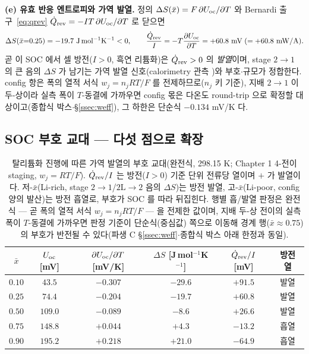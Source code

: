 \textbf{(e) 유효 반응 엔트로피와 가역 발열.} 정의 $\Delta S(\bar x)=F\,\partial U_{\mathrm{oc}}/\partial T$ 와 Bernardi
출구~\eqref{eq:qrev} $\dot Q_{\mathrm{rev}}=-IT\,\partial U_{\mathrm{oc}}/\partial T$ 로 닫으면
\begin{equation*}
\Delta S(\bar x{=}0.25)=-19.7\ \mathrm{J\,mol^{-1}K^{-1}}<0,
\qquad
\frac{\dot Q_\rev}{I}=-T\frac{\partial U_\oc}{\partial T}=+60.8\ \mathrm{mV}\;(=+60.8\ \mathrm{mW/A}).
\end{equation*}
곧 이 SOC 에서 셀 방전($I>0$, 흑연 리튬화)은 $\dot Q_{\mathrm{rev}}>0$ 의 \emph{발열}이며, stage $2\!\to\!1$ 의 큰 음의
$\Delta S$ 가 남기는 가역 발열 신호(calorimetry 관측 \cite{standardised2024})와 부호$\cdot$규모가 정합한다.
config 항은 폭의 열적 서식 $w_j{=}n_jRT/F$ 를 전제하므로($n_j$ 키 기준), 지배 $2\!\to\!1$ 이 두-상이라 실측
폭이 $T$-동결에 가까우면 config 몫은 다온도 round-trip 으로 확정할 대상이고(종합식 박스$\cdot$\S\ref{ssec:weff}),
그 하한은 단순식 $-0.134$ mV/K 다.

\subsection{SOC 부호 교대 --- 다섯 점으로 확장}\label{ssec:qrevtab}
\begin{table}[t]
\centering\small
\renewcommand{\arraystretch}{1.25}
\caption{탈리튬화 진행에 따른 가역 발열의 부호 교대(완전식, 298.15 K; Chapter 1 4-전이 staging, $w_j{=}RT/F$).
$\dot Q_{\mathrm{rev}}/I$ 는 방전($I>0$) 기준 단위 전류당 열이며 $+$ 가 발열이다. 저-$\bar x$(Li-rich, stage
$2\!\to\!1$/$2\mathrm L\!\to\!2$ 음의 $\Delta S$)는 방전 발열, 고-$\bar x$(Li-poor, config 양의 발산)는 방전
흡열로, 부호가 SOC 를 따라 뒤집힌다. 행별 흡/발열 판정은 완전식 --- 곧 폭의 열적 서식
$w_j{=}n_jRT/F$ --- 을 전제한 값이며, 지배 두-상 전이의 실측 폭이 $T$-동결에 가까우면 판정 기준이
단순식(중심값) 쪽으로 이동해 경계 행($\bar x{\approx}0.75$)의 부호가 반전될 수 있다(파생 C
\S\ref{ssec:weff}$\cdot$종합식 박스 아래 한정과 동일).}
\label{tab:qrev}
\begin{tabular}{cccccc}
\toprule
$\bar x$ & $U_{\mathrm{oc}}$ [mV] & $\partial U_{\mathrm{oc}}/\partial T$ [mV/K] & $\Delta S$ [J\,mol$^{-1}$K$^{-1}$] & $\dot Q_{\mathrm{rev}}/I$ [mV] & 방전 열 \\
\midrule
$0.10$ & $43.5$  & $-0.307$ & $-29.6$ & $+91.5$ & 발열 \\
$0.25$ & $74.4$  & $-0.204$ & $-19.7$ & $+60.8$ & 발열 \\
$0.50$ & $109.0$ & $-0.089$ & $-8.6$  & $+26.6$ & 발열 \\
$0.75$ & $148.8$ & $+0.044$ & $+4.3$  & $-13.2$ & 흡열 \\
$0.90$ & $195.2$ & $+0.218$ & $+21.0$ & $-64.9$ & 흡열 \\
\bottomrule
\end{tabular}
\end{table}

